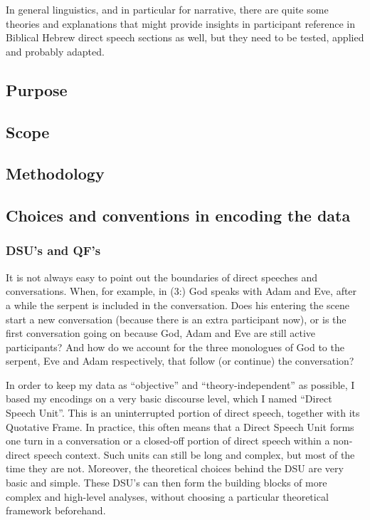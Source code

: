 \documentclass[twoside,a4paper,10pt]{article}
\begin{document}
In general linguistics, and in particular for narrative, there are quite some theories and explanations that might provide insights in participant reference in Biblical Hebrew direct speech sections as well, but they need to be tested, applied and probably adapted. \\

\subsection{Purpose}
\subsection{Scope}
\subsection{Methodology}
\subsection{Choices and conventions in encoding the data}
\subsubsection{DSU's and QF's}
It is not always easy to point out the boundaries of direct speeches and conversations. When, for example, in (3:) God speaks with Adam and Eve, after a while the serpent is included in the conversation. Does his entering the scene start a new conversation (because there is an extra participant now), or is the first conversation going on because God, Adam and Eve are still active participants? And how do we account for the three monologues of God to the serpent, Eve and Adam respectively, that follow (or continue) the conversation?

In order to keep my data as ``objective'' and ``theory-independent'' as possible, I based my encodings on a very basic discourse level, which I named ``Direct Speech Unit''. This is an uninterrupted portion of direct speech, together with its Quotative Frame. In practice, this often means that a Direct Speech Unit forms one turn in a conversation or a closed-off portion of direct speech within a non-direct speech context. Such units can still be long and complex, but most of the time they are not. Moreover, the theoretical choices behind the DSU are very basic and simple. These DSU's can then form the building blocks of more complex and high-level analyses, without choosing a particular theoretical framework beforehand. 
\end{document}
